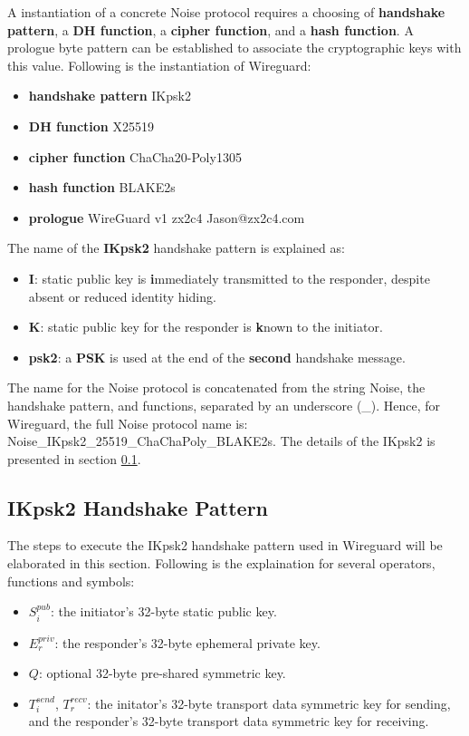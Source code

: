 A instantiation of a concrete Noise protocol requires a choosing of \textbf{handshake pattern}, a
\textbf{DH function}, a \textbf{cipher function}, and a \textbf{hash function}. A prologue byte pattern 
can be established to associate the cryptographic keys with this value. Following is the instantiation
of Wireguard:
\begin{itemize}
  \item \textbf{handshake pattern}  IKpsk2
  \item \textbf{DH function} X25519
  \item \textbf{cipher function} ChaCha20-Poly1305
  \item \textbf{hash function} BLAKE2s
  \item \textbf{prologue} WireGuard v1 zx2c4 Jason@zx2c4.com
\end{itemize}

The name of the \textbf{IKpsk2} handshake pattern is explained as:
\begin{itemize}
  \item \textbf{I}: static public key is \textbf{i}mmediately transmitted to the
  responder, despite absent or reduced identity hiding.
  \item \textbf{K}: static public key for the responder is \textbf{k}nown to the initiator.
  \item \textbf{psk2}: a \textbf{PSK} is used at the end of the \textbf{second} handshake message.
\end{itemize}

The name for the Noise protocol is concatenated from the string Noise, the
handshake pattern, and functions, separated by an underscore ({\_}). Hence, for Wireguard,
the full Noise protocol name is:  Noise{\_}IKpsk2{\_}25519{\_}ChaChaPoly{\_}BLAKE2s.
The details of the IKpsk2 is presented in section \ref{ikpsk2}.

\subsection{IKpsk2 Handshake Pattern} \label{ikpsk2}
  The steps to execute the IKpsk2 handshake pattern used in Wireguard will be elaborated in this
  section. Following is the explaination for several operators, functions and symbols:
    \begin{itemize}
      \item $S^{pub}_i$: the initiator's 32-byte static public key.
      \item $E^{priv}_r$: the responder's 32-byte ephemeral private key.
      \item $Q$: optional 32-byte pre-shared symmetric key.
      \item $T^{send}_i$, $T^{recv}_r$: the initator's 32-byte transport data symmetric key for sending,
      and the responder's 32-byte transport data symmetric key for receiving.
    \end{itemize}

